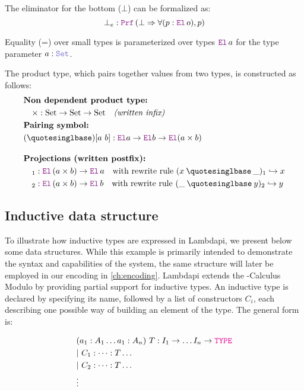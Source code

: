 \begin{example}
The eliminator for the bottom ($\bot$) can be formalized as:
\[ \bot_e : \prf\,(\bot \Rightarrow \forall (p: \el\,o), p) \]
\end{example}

Equality (=) over small types is parameterized over types $\el\,a$ for the type parameter $a : \set{}$.


\begin{example}\label{def-product}
The product type, which pairs together values from two types, is constructed as follows:
\begin{align*}
&\textbf{Non dependent product type:} \\
&\quad \times : \text{Set} \to \text{Set} \to \text{Set} \quad \textit{(written infix)} \\
&\textbf{Pairing symbol:} \\
&(\mathbin{‚}) [a~b] : \el a \ra \el b \ra \el (a \times b)\\[1em]
&\textbf{Projections (written postfix):}  \\
&\quad {}_1 : \el\, (a \times b) \ra \el\, a \quad \text{with rewrite rule } (x \mathbin{‚} \_)_1 \re x \\
&\quad {}_2 : \el\, (a \times b) \ra \el\, b \quad \text{with rewrite rule } (\_ \mathbin{‚} y)_2 \re y
\end{align*}
\end{example}


\subsection{Inductive data structure}

To illustrate how inductive types are expressed in Lambdapi, we present below some data structures.
While this example is primarily intended to demonstrate the syntax and capabilities of the system, the same structure will later be employed in our encoding in \cref{ch:encoding}.
Lambdapi extends the \lpm-Calculus Modulo by providing partial support for inductive types.
An inductive type is declared by specifying its name, followed by a list of constructors $C_i$, each describing one possible way of building an element of the type.
The general form is:

\begin{align*}
&(a_1 : A_1 \dots a_1 : A_n)~T : I_1 \ra \dots I_n \ra \type\\
&|~C_1 : \dots : T \dots\\
&|~C_2 : \dots : T \dots\\
&\vdots
\end{align*}

